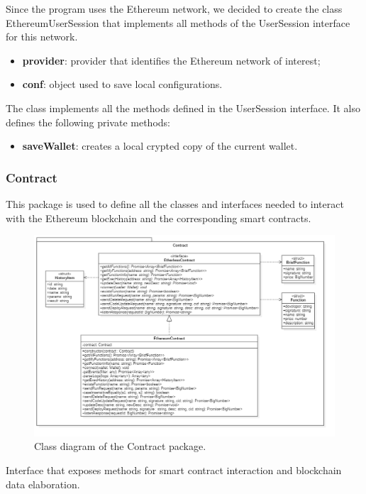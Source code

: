 			Since the program uses the Ethereum network, we decided to create the class EthereumUserSession that implements all methods of the UserSession interface for this network.
					\begin{itemize}
						\item \textbf{provider}: provider that identifies the Ethereum network of interest;
						\item \textbf{conf}: object used to save local configurations.
					\end{itemize}

				The class implements all the methods defined in the UserSession interface. It also defines the following private methods:
					\begin{itemize}
						\item\textbf{saveWallet}: creates a local crypted copy of the current wallet.
					\end{itemize}

		\subsubsection{Contract}
		This package is used to define all the classes and interfaces needed to interact with the Ethereum blockchain and the corresponding smart contracts.
		\begin{figure} [h!]
			\centering
			\includegraphics[width=0.75\linewidth]{diagrammi/etherless-cli/Contract}
			\caption{Class diagram of the Contract package.}
		\end{figure}

			Interface that exposes methods for smart contract interaction and blockchain data elaboration.


